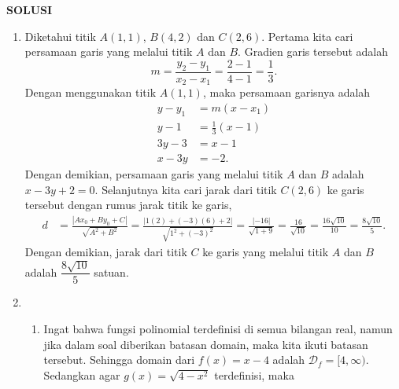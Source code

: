 \documentclass[11pt,openany,a4paper]{article}
\renewcommand{\headrulewidth}{0pt}
\begin{document}


\newpage
\fancyfoot{}
{\centering\textbf{SOLUSI}}
\renewcommand{\arraystretch}{1.5}
\renewcommand{\headrulewidth}{1pt}
\begin{enumerate}
    \item Diketahui titik $A(1,1)$, $B(4,2)$ dan $C(2,6)$. Pertama kita cari persamaan garis yang melalui titik $A$ dan $B$. Gradien garis tersebut adalah
          \[
              m = \frac{y_2 - y_1}{x_2 - x_1} = \frac{2 - 1}{4 - 1} = \frac{1}{3}.
          \]
          Dengan menggunakan titik $A(1,1)$, maka persamaan garisnya adalah
          \begin{align*}
              y - y_1 & = m(x - x_1)         \\
              y - 1   & = \frac{1}{3}(x - 1) \\
              3y - 3  & = x - 1              \\
              x - 3y  & = -2.
          \end{align*}
          Dengan demikian, persamaan garis yang melalui titik $A$ dan $B$ adalah $x - 3y + 2 = 0$. Selanjutnya kita cari jarak dari titik $C(2,6)$ ke garis tersebut dengan rumus jarak titik ke garis,
          \begin{align*}
              d & = \frac{|Ax_0 + By_0 + C|}{\sqrt{A^2 + B^2}}       = \frac{|1(2) + (-3)(6) + 2|}{\sqrt{1^2 + (-3)^2}} = \frac{|-16|}{\sqrt{1 + 9}} = \frac{16}{\sqrt{10}}                             = \frac{16\sqrt{10}}{10}                            = \frac{8\sqrt{10}}{5}.
          \end{align*}
          Dengan demikian, jarak dari titik $C$ ke garis yang melalui titik $A$ dan $B$ adalah $\dfrac{8\sqrt{10}}{5}$ satuan.
    \item \begin{enumerate}
              \item Ingat bahwa fungsi polinomial terdefinisi di semua bilangan real, namun jika dalam soal diberikan batasan domain, maka kita ikuti batasan tersebut. Sehingga domain dari $f(x) = x - 4$ adalah $\mathcal{D}_f = [4,\infty)$. Sedangkan agar $g(x) = \sqrt{4 - x^2}$ terdefinisi, maka

\end{enumerate}
\end{enumerate}
\end{document}
